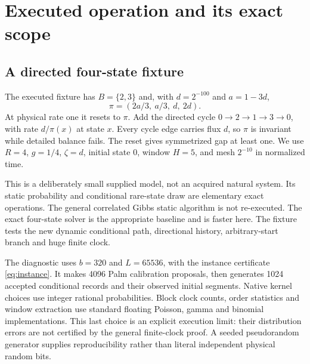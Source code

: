 \section{Executed operation and its exact scope}

\subsection{A directed four-state fixture}
The executed fixture has $B=\{2,3\}$ and, with $d=2^{-100}$ and $a=1-3d$,
\[
\pi=(2a/3,\ a/3,\ d,\ 2d).
\]
At physical rate one it resets to $\pi$. Add the directed cycle
$0\to2\to1\to3\to0$, with rate $d/\pi(x)$ at state $x$.
Every cycle edge carries flux $d$, so $\pi$ is invariant while detailed
balance fails. The reset gives symmetrized gap at least one. We use $R=4$,
$g=1/4$, $\zeta=d$, initial state $0$, window $H=5$, and mesh $2^{-10}$
in normalized time.

This is a deliberately small supplied model, not an acquired natural system.
Its static probability and conditional rare-state draw are elementary exact
operations. The general correlated Gibbs static algorithm is not re-executed.
The exact four-state solver is the appropriate baseline and is faster here.
The fixture tests the new dynamic conditional path, directional history,
arbitrary-start branch and huge finite clock.

The diagnostic uses $b=320$ and $L=65536$, with the instance certificate
\eqref{eq:instance}. It makes 4096 Palm calibration proposals, then generates
1024 accepted conditional records and their observed initial segments.
Native kernel choices use integer rational probabilities. Block clock counts,
order statistics and window extraction use standard floating Poisson,
gamma and binomial implementations. This last choice is an explicit execution
limit: their distribution errors are not certified by the general finite-clock
proof. A seeded pseudorandom generator supplies reproducibility rather than
literal independent physical random bits.

